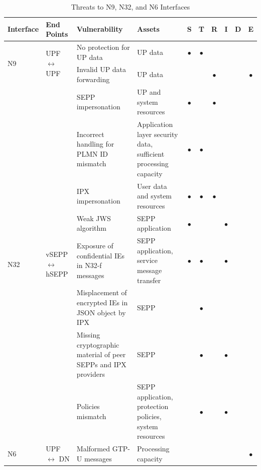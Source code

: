 \documentclass{report}
\begin{document}
\begin{table}[H]
    \centering
    \caption{Threats to N9, N32, and N6 Interfaces \cite{mahyoub2024security}}
    \renewcommand{\arraystretch}{1.2} 
    \setlength{\tabcolsep}{5pt} 
    \begin{tabularx}{\textwidth}{|l|l|X|X|c|c|c|c|c|c|}
    \hline
    \textbf{Interface} & \textbf{End Points} & \textbf{Vulnerability} & \textbf{Assets} & \textbf{S} & \textbf{T} & \textbf{R} & \textbf{I} & \textbf{D} & \textbf{E} \\ 
    \hline
    \multirow{2}{*}{N9} 
        & \multirow{2}{*}{UPF $\leftrightarrow$ UPF} 
        & No protection for UP data & UP data & $\bullet$ & $\bullet$ &  &  &  &  \\ \cline{3-10}
        & & Invalid UP data forwarding & UP data &  &  & $\bullet$ &  &  & $\bullet$ \\ \hline
    
    \multirow{8}{*}{N32} 
        & \multirow{8}{*}{vSEPP $\leftrightarrow$ hSEPP} 
        & SEPP impersonation & UP and system resources & $\bullet$ &  & $\bullet$ &  &  &  \\ \cline{3-10}
        & & Incorrect handling for PLMN ID mismatch & Application layer security data, sufficient processing capacity & $\bullet$ & $\bullet$ &  &  &  &  \\ \cline{3-10}
        & & IPX impersonation & User data and system resources & $\bullet$ & $\bullet$ & $\bullet$ &  &  &  \\ \cline{3-10}
        & & Weak JWS algorithm & SEPP application & $\bullet$ &  &  & $\bullet$ &  &  \\ \cline{3-10}
        & & Exposure of confidential IEs in N32-f messages & SEPP application, service message transfer & $\bullet$ & $\bullet$ &  & $\bullet$ &  &  \\ \cline{3-10}
        & & Misplacement of encrypted IEs in JSON object by IPX & SEPP &  & $\bullet$ &  &  &  &  \\ \cline{3-10}
        & & Missing cryptographic material of peer SEPPs and IPX providers & SEPP &  & $\bullet$ &  & $\bullet$ &  &  \\ \cline{3-10}
        & & Policies mismatch & SEPP application, protection policies, system resources &  & $\bullet$ &  & $\bullet$ &  &  \\ \hline
    
    \multirow{1}{*}{N6} 
        & UPF $\leftrightarrow$ DN 
        & Malformed GTP-U messages & Processing capacity &  &  &  &  &  & $\bullet$ \\ \hline
    
    \end{tabularx}
\end{table}
 
\end{document}
